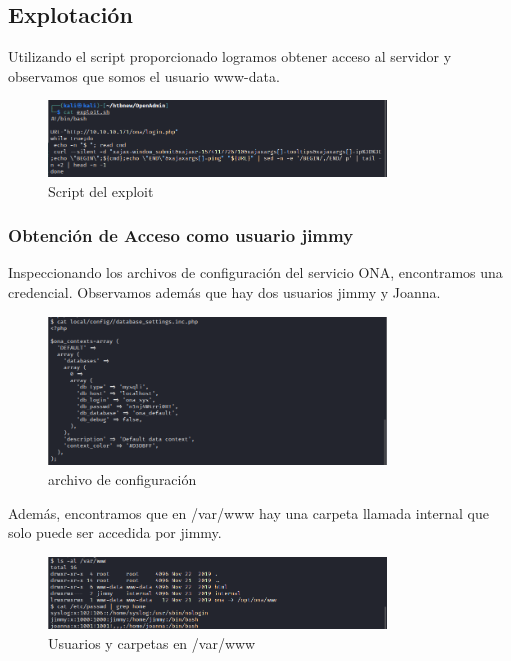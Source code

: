 \documentclass{article}
\begin{document}
\subsection{Explotación}

Utilizando el script proporcionado logramos obtener acceso al servidor y observamos que somos el usuario www-data.
\begin{figure}[h]
	\center
	\includegraphics[width=0.8\textwidth]{images/openadmin/7-script.png}
	\caption{Script del exploit}
\end{figure}

\subsubsection{Obtención de Acceso como usuario jimmy}

Inspeccionando los archivos de configuración del servicio ONA, encontramos una credencial. Observamos además que hay dos usuarios jimmy y Joanna.
\begin{figure}[h]
	\center
	\includegraphics[width=0.8\textwidth]{images/openadmin/8-credencialesjimmy.png}
	\caption{archivo de configuración}
\end{figure}

Además, encontramos que en /var/www hay una carpeta llamada internal que solo puede ser accedida por jimmy.
\begin{figure}[h]
	\center
	\includegraphics[width=0.8\textwidth]{images/openadmin/9-usuariosycarpetas.png}
	\caption{Usuarios y carpetas en /var/www}
\end{figure}
\end{document}
